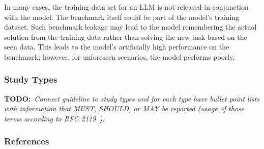 \documentclass[11pt]{article}
\newcommand{\todo}[1]{{\textbf{TODO:}\ \textit{#1}}} %
\begin{document}
In many cases, the training data set for an LLM is not released in conjunction with the model.
The benchmark itself could be part of the model's training dataset.
Such benchmark leakage may lead to the model remembering the actual solution from the training data rather than solving the new task based on the seen data.
This leads to the model's artificially high performance on the benchmark; however, for unforeseen scenarios, the model performs poorly.

\subsubsection{Study Types}

\todo{Connect guideline to study types and for each type have bullet point lists with information that MUST, SHOULD, or MAY be reported (usage of those terms according to RFC 2119~\cite{rfc2119}).}

\subsubsection{References}



\end{document}
